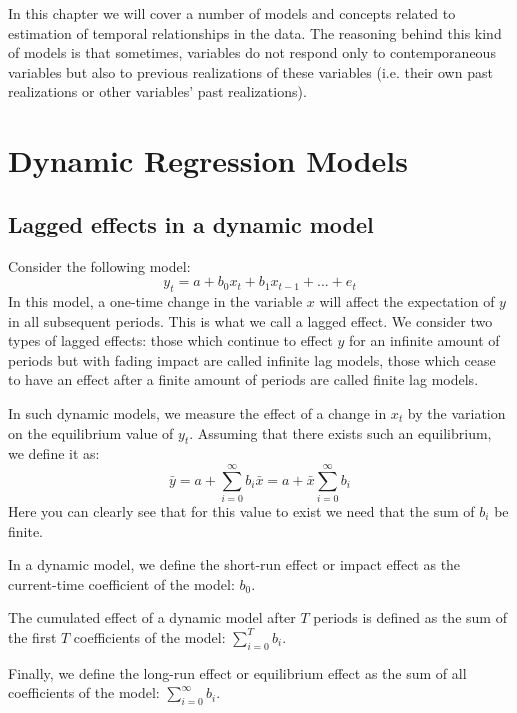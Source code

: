 In this chapter we will cover a number of models and concepts related to estimation of temporal relationships in the data. The reasoning behind this kind of models is that sometimes, variables do not respond only to contemporaneous variables but also to previous realizations of these variables (i.e. their own past realizations or other variables' past realizations).

\section{Dynamic Regression Models}

\subsection{Lagged effects in a dynamic model}

Consider the following model: $$y_t = a + b_0 x_t + b_1 x_{t-1} + ... + e_t $$ In this model, a one-time change in the variable $x$ will affect the expectation of $y$ in all subsequent periods. This is what we call a lagged effect. We consider two types of lagged effects: those which continue to effect $y$ for an infinite amount of periods but with fading impact are called infinite lag models, those which cease to have an effect after a finite amount of periods are called finite lag models.

In such dynamic models, we measure the effect of a change in $x_t$ by the variation on the equilibrium value of $y_t$. Assuming that there exists such an equilibrium, we define it as: $$\bar y = a + \sum_{i=0}^{\infty} b_i\bar x = a + \bar x\sum_{i=0}^{\infty} b_i $$ Here you can clearly see that for this value to exist we need that the sum of $b_i$ be finite.

\begin{definition}
In a dynamic model, we define the short-run effect or impact effect as the current-time coefficient of the model: $b_0$.
\end{definition}

\begin{definition}
The cumulated effect of a dynamic model after $T$ periods is defined as the sum of the first $T$ coefficients of the model: $\sum_{i=0}^{T} b_i$.
\end{definition}

\begin{definition}
Finally, we define the long-run effect or equilibrium effect as the sum of all coefficients of the model: $\sum_{i=0}^{\infty} b_i$.
\end{definition}

